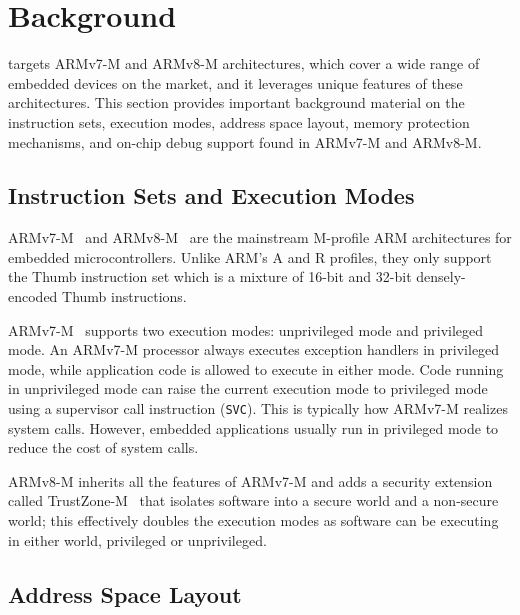 \section{Background}
\label{sec:bg}

{\System} targets ARMv7-M and ARMv8-M architectures, which cover a wide
range of embedded devices on the market, and it leverages unique
features of these architectures.  This section provides
important background material on the instruction sets, execution modes,
address space layout, memory protection mechanisms, and on-chip debug
support found in ARMv7-M and ARMv8-M.

\subsection{Instruction Sets and Execution Modes}
\label{sec:bg:isa}

ARMv7-M~\cite{ARMv7-M:Manual} and ARMv8-M~\cite{ARMv8-M:Manual} are the
mainstream M-profile ARM architectures for embedded microcontrollers.
Unlike ARM's A and R profiles, they only support the Thumb instruction
set which is a mixture of 16-bit and 32-bit densely-encoded Thumb
instructions.

ARMv7-M~\cite{ARMv7-M:Manual} supports two execution modes:
unprivileged mode and
privileged mode.  An ARMv7-M processor always executes
exception handlers in privileged mode, while application code is allowed
to execute in either mode.  Code running in unprivileged mode can raise the
current execution mode to
privileged mode using a supervisor call instruction ({\tt SVC}).
This is typically how ARMv7-M realizes system calls.  However,
embedded applications usually run in privileged mode to reduce
the cost of system calls.

ARMv8-M inherits all the features of ARMv7-M and adds a security
extension called TrustZone-M~\cite{ARMv8-M:Manual} that isolates
software into a secure world and a non-secure world; this effectively
doubles the execution modes as software can be executing in either world,
privileged or unprivileged.

\subsection{Address Space Layout}
\label{sec:bg:layout}

